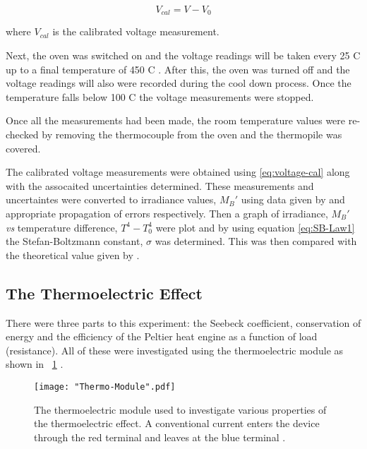 \documentclass{article}
\newcommand{\figref}[2][\figurename~]{#1\ref{#2}}
\begin{document}
\begin{equation}
\label{eq:voltage-cal}
V_{cal} = V - V_0
\end{equation}

\vspace{2mm}
\noindent
where $V_{cal}$ is the calibrated voltage measurement. 

\vspace{2mm}
\noindent
Next, the oven was switched on and the voltage readings will be taken every 25 C up to a final temperature of 450 C \cite{Paper01}. After this, the oven was turned off and the voltage readings will also were recorded during the cool down process. Once the temperature falls below 100 C \cite{Paper01} the voltage measurements were stopped.

\vspace{2mm}
\noindent
Once all the measurements had been made, the room temperature values were re-checked by removing the thermocouple from the oven and the thermopile was covered.

\vspace{2mm}
\noindent
The calibrated voltage measurements were obtained using \eqref{eq:voltage-cal} along with the assocaited uncertainties determined. These measurements and uncertaintes were converted to irradiance values, $M_B'$ using data given by \cite{Paper01} and appropriate propagation of errors respectively. Then a graph of irradiance, $M_B'$ \textit{vs} temperature difference, $T^4 - T_0^4$ were plot and by using equation \eqref{eq:SB-Law1} the Stefan-Boltzmann constant, $\sigma$ was determined. This was then compared with the theoretical value given by \cite{Paper01}.

\subsection{The Thermoelectric Effect}
\label{ssec:thermoelectric-method}

There were three parts to this experiment: the Seebeck coefficient, conservation of energy and the efficiency of the Peltier heat engine as a function of load (resistance). All of these were investigated using the thermoelectric module as shown in \figref{fig:Thermo-Module} \cite{Paper02}. 

\begin{figure}[h]
\centering
\texttt{[image: "Thermo-Module".pdf]}
\caption{The thermoelectric module used to investigate various properties of the thermoelectric effect. A conventional current enters the device through the red terminal and leaves at the blue terminal \cite{Paper02}.}
\label{fig:Thermo-Module}
\end{figure}
\end{document}
